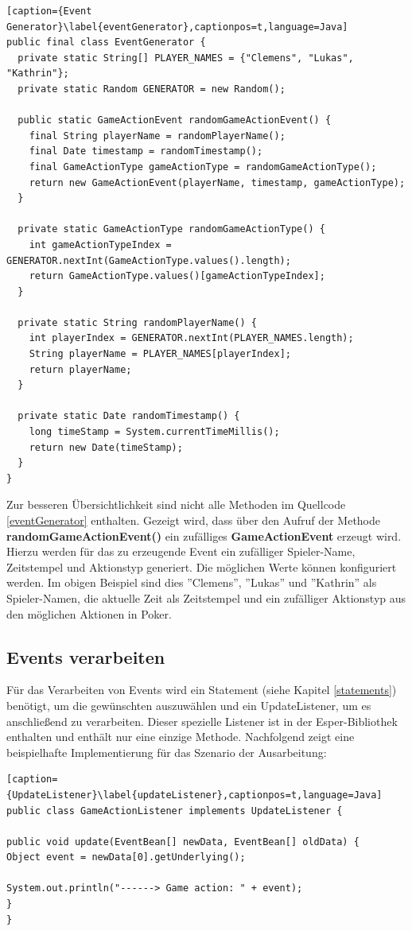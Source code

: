 \begin{lstlisting}[caption={Event Generator}\label{eventGenerator},captionpos=t,language=Java]
public final class EventGenerator {
  private static String[] PLAYER_NAMES = {"Clemens", "Lukas", "Kathrin"};
  private static Random GENERATOR = new Random();
  
  public static GameActionEvent randomGameActionEvent() {
    final String playerName = randomPlayerName();
    final Date timestamp = randomTimestamp();
    final GameActionType gameActionType = randomGameActionType();
    return new GameActionEvent(playerName, timestamp, gameActionType);
  }

  private static GameActionType randomGameActionType() {
    int gameActionTypeIndex = GENERATOR.nextInt(GameActionType.values().length);
    return GameActionType.values()[gameActionTypeIndex];
  }

  private static String randomPlayerName() {
    int playerIndex = GENERATOR.nextInt(PLAYER_NAMES.length);
    String playerName = PLAYER_NAMES[playerIndex];
    return playerName;
  }

  private static Date randomTimestamp() {
    long timeStamp = System.currentTimeMillis();
    return new Date(timeStamp);
  }
}
\end{lstlisting}

Zur besseren Übersichtlichkeit sind nicht alle Methoden im Quellcode \ref{eventGenerator} enthalten.
Gezeigt wird, dass über den Aufruf der Methode \textbf{randomGameActionEvent()} ein zufälliges \textbf{GameActionEvent} erzeugt wird. Hierzu werden für das zu erzeugende Event ein zufälliger Spieler-Name, Zeitstempel und Aktionstyp generiert. Die möglichen Werte können konfiguriert werden. Im obigen Beispiel sind dies ''Clemens'', ''Lukas'' und ''Kathrin'' als Spieler-Namen, die aktuelle Zeit als Zeitstempel und ein zufälliger Aktionstyp aus den möglichen Aktionen in Poker.

\subsection{Events verarbeiten}
Für das Verarbeiten von Events wird ein Statement (siehe Kapitel \ref{statements}) benötigt, um die gewünschten auszuwählen und ein UpdateListener, um es anschließend zu verarbeiten. Dieser spezielle Listener ist in der Esper-Bibliothek enthalten und enthält nur eine einzige Methode. Nachfolgend zeigt eine beispielhafte Implementierung für das Szenario der Ausarbeitung:

\begin{lstlisting}[caption={UpdateListener}\label{updateListener},captionpos=t,language=Java]
public class GameActionListener implements UpdateListener {

public void update(EventBean[] newData, EventBean[] oldData) {
Object event = newData[0].getUnderlying();

System.out.println("------> Game action: " + event);
}
}
\end{lstlisting}

